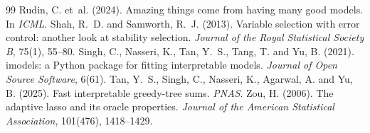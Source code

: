 \documentclass[11pt,a4paper]{article}
\theoremstyle{definition}\newtheorem{definition}{Definition}
\begin{document}
\begin{thebibliography}{99}
 Rudin, C. et~al. (2024). Amazing things come from having many good models. In \emph{ICML}.
 Shah, R.~D. and Samworth, R.~J. (2013). Variable selection with error control: another look at stability selection. \emph{Journal of the Royal Statistical Society B}, 75(1), 55--80.
 Singh, C., Nasseri, K., Tan, Y.~S., Tang, T. and Yu, B. (2021). imodels: a Python package for fitting interpretable models. \emph{Journal of Open Source Software}, 6(61).
 Tan, Y.~S., Singh, C., Nasseri, K., Agarwal, A. and Yu, B. (2025). Fast interpretable greedy-tree sums. \emph{PNAS}.
 Zou, H. (2006). The adaptive lasso and its oracle properties. \emph{Journal of the American Statistical Association}, 101(476), 1418--1429.
\end{thebibliography}
\end{document}
